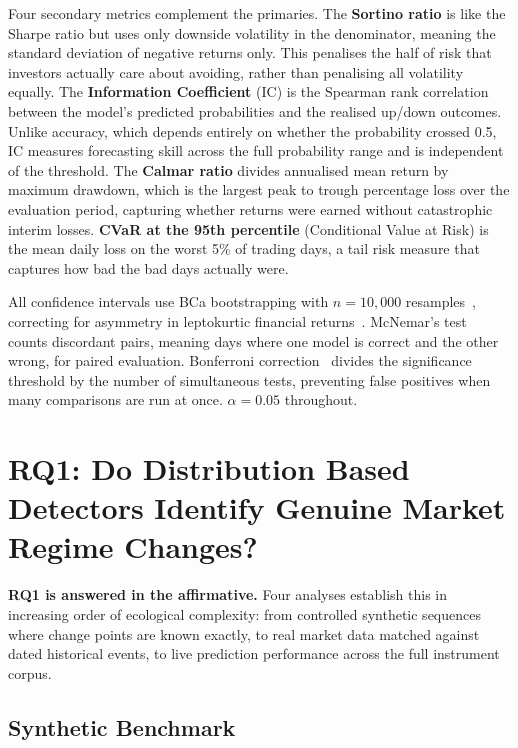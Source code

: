 Four secondary metrics complement the primaries. The \textbf{Sortino ratio} is like the Sharpe ratio but uses only downside volatility in the denominator, meaning the standard deviation of negative returns only. This penalises the half of risk that investors actually care about avoiding, rather than penalising all volatility equally. The \textbf{Information Coefficient} (IC) is the Spearman rank correlation between the model's predicted probabilities and the realised up/down outcomes. Unlike accuracy, which depends entirely on whether the probability crossed 0.5, IC measures forecasting skill across the full probability range and is independent of the threshold. The \textbf{Calmar ratio} divides annualised mean return by maximum drawdown, which is the largest peak to trough percentage loss over the evaluation period, capturing whether returns were earned without catastrophic interim losses. \textbf{CVaR at the 95th percentile} (Conditional Value at Risk) is the mean daily loss on the worst 5\% of trading days, a tail risk measure that captures how bad the bad days actually were.

All confidence intervals use BCa bootstrapping with $n{=}10{,}000$ resamples~\cite{efron1987,efron1993}, correcting for asymmetry in leptokurtic financial returns~\cite{engle1982}. McNemar's test~\cite{mcnemar1947} counts discordant pairs, meaning days where one model is correct and the other wrong, for paired evaluation. Bonferroni correction~\cite{dunn1961} divides the significance threshold by the number of simultaneous tests, preventing false positives when many comparisons are run at once. $\alpha{=}0.05$ throughout.

\section{RQ1: Do Distribution Based Detectors Identify Genuine Market Regime Changes?}
\label{sec:rq1}

\textbf{RQ1 is answered in the affirmative.} Four analyses establish this in increasing order of ecological complexity: from controlled synthetic sequences where change points are known exactly, to real market data matched against dated historical events, to live prediction performance across the full instrument corpus.

\subsection{Synthetic Benchmark}
\label{subsec:synthetic}

